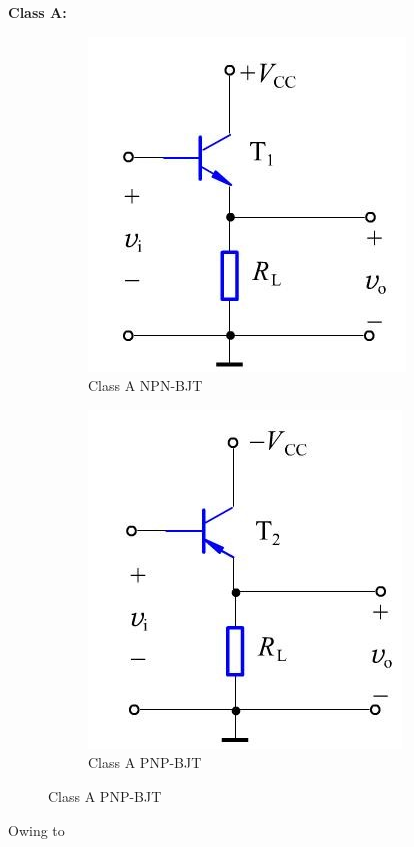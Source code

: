 \documentclass[a4paper,11pt,UTF8]{article}
\begin{document}
\textbf{Class A: }
\begin{figure}[H]
	\begin{minipage}{.5\textwidth}
		\begin{figure}[H] 
			\centering 
			\includegraphics[scale=0.7]{./img/7.1}
			\caption{Class A NPN-BJT}
		\end{figure}
	\end{minipage}
	\begin{minipage}{.5\textwidth}
		\begin{figure}[H] 
			\centering 
			\includegraphics[scale=0.7]{./img/7.2}
			\caption{Class A PNP-BJT}
		\end{figure}
	\end{minipage}
\end{figure}
Owing to 
\end{document}
